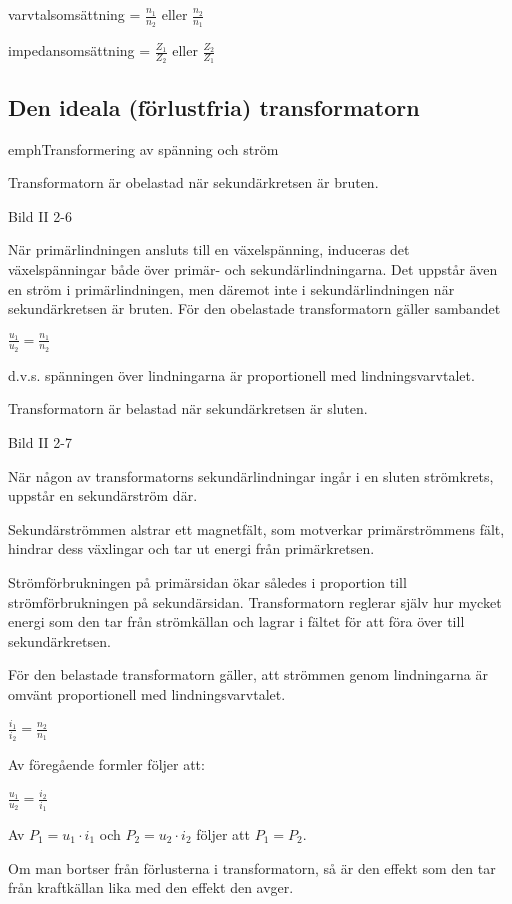 varvtalsomsättning = \(\frac{n_1}{n_2}\) eller \(\frac{n_2}{n_1}\)

impedansomsättning = \(\frac{Z_1}{Z_2}\) eller \(\frac{Z_2}{Z_1}\)

\subsection{Den ideala (förlustfria) transformatorn}

emph{Transformering av spänning och ström}

Transformatorn är obelastad när sekundärkretsen är bruten.

Bild II 2-6

När primärlindningen ansluts till en växelspänning, induceras det
växelspänningar både över primär- och sekundärlindningarna. Det uppstår även en
ström i primärlindningen, men däremot inte i sekundärlindningen när
sekundärkretsen är bruten. För den obelastade transformatorn gäller sambandet

\(\frac{u_1}{u_2} = \frac{n_1}{n_2}\)

d.v.s. spänningen över lindningarna är proportionell med lindningsvarvtalet.

Transformatorn är belastad när sekundärkretsen är sluten.

Bild II 2-7

När någon av transformatorns sekundärlindningar ingår i en sluten strömkrets,
uppstår en sekundärström där.

Sekundärströmmen alstrar ett magnetfält, som motverkar primärströmmens fält,
hindrar dess växlingar och tar ut energi från primärkretsen.

Strömförbrukningen på primärsidan ökar således i proportion till
strömförbrukningen på sekundärsidan. Transformatorn reglerar själv hur mycket
energi som den tar från strömkällan och lagrar i fältet för att föra över
till sekundärkretsen.

För den belastade transformatorn gäller, att strömmen genom lindningarna är
omvänt proportionell med lindningsvarvtalet.

\(\frac{i_1}{i_2} = \frac{n_2}{n_1}\)

Av föregående formler följer att:

\(\frac{u_1}{u_2} = \frac{i_2}{i_1}\)

Av \(P_1 = u_1 \cdot i_1\) och \(P_2 = u_2 \cdot i_2\) följer att \(P_1 = P_2\).

Om man bortser från förlusterna i transformatorn, så är den effekt som den tar
från kraftkällan lika med den effekt den avger.

